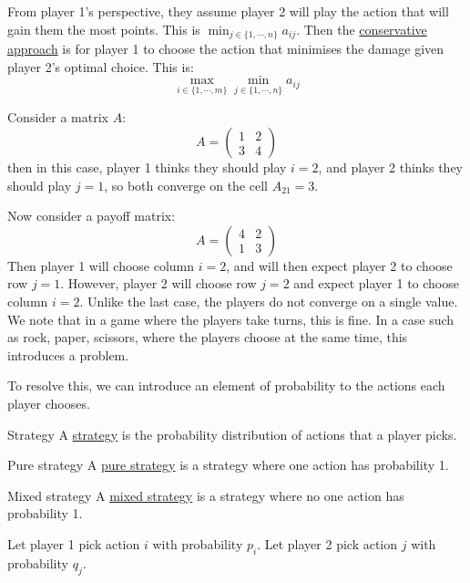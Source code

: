 \documentclass[../Main.tex]{subfiles}
\begin{document}
From player 1's perspective, they assume player 2 will play the action that will gain them the most points. This is $\min_{j \in \{1, \cdots, n\}} a_{ij}$.
Then the \underline{conservative approach} is for player 1 to choose the action that minimises the damage given player 2's optimal choice. This is:
\begin{equation*}
    \max_{i \in \{1, \cdots, m\}} \min_{j \in \{1, \cdots, n\}} a_{ij}
\end{equation*}
\begin{example}
    Consider a matrix $A$:
    \begin{equation*}
        A =
        \begin{pmatrix}
            1 & 2 \\
            3 & 4
        \end{pmatrix}
    \end{equation*}
    then in this case, player 1 thinks they should play $i = 2$, and player 2 thinks they should play $j = 1$, so both converge on the cell $A_{21} = 3$.
\end{example}
\begin{example}
    Now consider a payoff matrix:
    \begin{equation*}
        A =
        \begin{pmatrix}
            4 & 2 \\
            1 & 3
        \end{pmatrix} 
    \end{equation*}
    Then player 1 will choose column $i = 2$, and will then expect player 2 to choose row $j = 1$. However, player 2 will choose row $j = 2$ and expect player 1 to choose column $i = 2$. Unlike the last case, the players do not converge on a single value. We note that in a game where the players take turns, this is fine. In a case such as rock, paper, scissors, where the players choose at the same time, this introduces a problem.
\end{example}
To resolve this, we can introduce an element of probability to the actions each player chooses.
\begin{definition}{Strategy}
    A \underline{strategy} is the probability distribution of actions that a player picks.
\end{definition}
\begin{definition}{Pure strategy}
    A \underline{pure strategy} is a strategy where one action has probability 1.
\end{definition}
\begin{definition}{Mixed strategy}
    A \underline{mixed strategy} is a strategy where no one action has probability 1.
\end{definition}
Let player 1 pick action $i$ with probability $p_i$. Let player 2 pick action $j$ with probability $q_j$.
\end{document}
